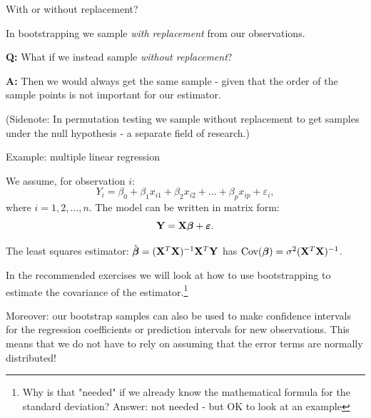 \documentclass[10pt,ignorenonframetext,]{beamer}
\begin{document}
\begin{frame}

\begin{block}{With or without replacement?}

\vspace{2mm}

In bootstrapping we sample \emph{with replacement} from our
observations.

\vspace{4mm}

\textbf{Q:} What if we instead sample \emph{without replacement}?

\vspace{2mm}

\textbf{A:} Then we would always get the same sample - given that the
order of the sample points is not important for our estimator.

\vspace{4mm}

(Sidenote: In permutation testing we sample without replacement to get
samples under the null hypothesis - a separate field of research.)

\end{block}

\end{frame}

\begin{frame}

\begin{block}{Example: multiple linear regression}

We assume, for observation \(i\):
\[Y_i= \beta_0 + \beta_{1}  x_{i1} + \beta_2 x_{i2} + ... + \beta_p x_{ip} + \varepsilon_i,\]
where \(i=1,2,...,n\). The model can be written in matrix form:
\[{\bf Y}={\bf X} \boldsymbol{\beta}+{\boldsymbol{\varepsilon}}.\]

The least squares estimator:
\(\hat{\boldsymbol\beta}=({\bf X}^T{\bf X})^{-1} {\bf X}^T {\bf Y}\) has
\(\text{Cov}(\boldsymbol\beta)=\sigma^2({\bf X}^T{\bf X})^{-1}\).

In the recommended exercises we will look at how to use bootstrapping to
estimate the covariance of the estimator.\footnote{
Why is that "needed" if we already know the mathematical formula for the standard deviation? Answer: not needed - but OK to look at an example}

\vspace{2mm} \normalsize

Moreover: our bootstrap samples can also be used to make confidence
intervals for the regression coefficients or prediction intervals for
new observations. This means that we do not have to rely on assuming
that the error terms are normally distributed!

\end{block}

\end{frame}
\end{document}
